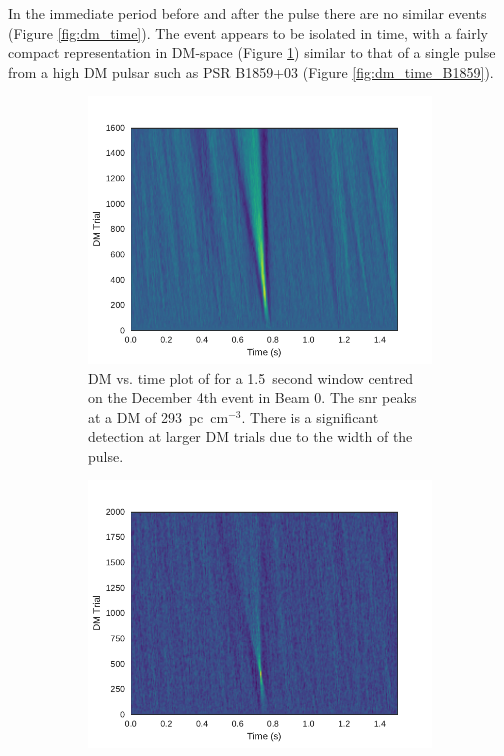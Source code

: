 \documentclass[a4paper,fleqn,usenatbib]{mnras}
\begin{document}
In the immediate period before and after the pulse there are no similar events
(Figure \ref{fig:dm_time}). The event appears to be isolated in time, with a
fairly compact representation in DM-space (Figure \ref{fig:dm_time_event})
similar to that of a single pulse from a high DM pulsar such as PSR B1859+03
(Figure \ref{fig:dm_time_B1859}).

\begin{figure}
    \centering
    \begin{subfigure}[t]{0.5\textwidth}
        \centering\captionsetup{width=.95\linewidth}
        \includegraphics[width=1.0\textwidth]{figures/D20161204_dmtrials_buf23_Beam0.pdf}
        \caption{DM vs. time plot of for a 1.5~second window centred on the
        December 4th event in Beam 0. The \gls{snr} peaks at a DM of
        293~pc~cm$^{-3}$. There is a significant detection at larger DM trials
        due to the width of the pulse.
        }
        \label{fig:dm_time_event}
    \end{subfigure}
    \begin{subfigure}[t]{0.5\textwidth}
        \centering\captionsetup{width=.95\linewidth}
        \includegraphics[width=1.0\textwidth]{figures/B1859_dmtrials.pdf}

\end{subfigure}
\end{figure}
\end{document}

